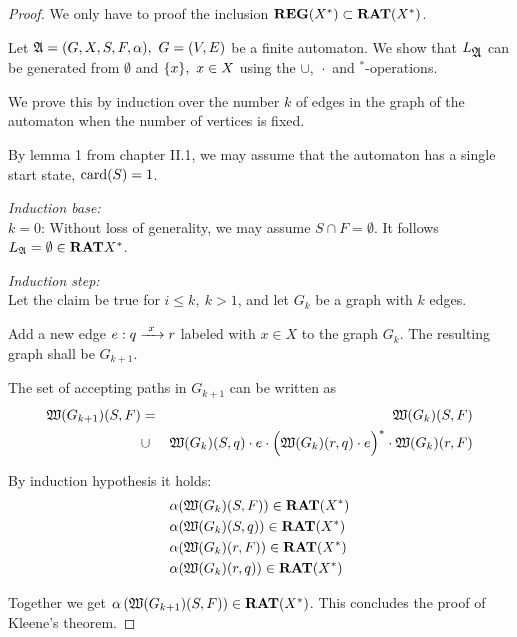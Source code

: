 \begin{proof}
We only have to proof the inclusion $\mbox{{\bf REG}}(X^*) \subset \mbox{{\bf RAT}}(X^*)$.

Let $\mbox{$\mathfrak{A}$} = (G, X, S, F, \alpha),\ G=(V, E)$ be a finite automaton. We show
that $L_{\mbox{$\mathfrak{A}$}}$ can be generated from $\emptyset$ and $\mbox{$\{x\}$},\ x \in X$ 
using the $\cup,\ \cdot$ and $^*$-operations.

We prove this by induction over the number $k$ of edges in the graph of the
automaton when the number of vertices is fixed.

By lemma 1 from chapter II.1, we may assume that the automaton has a single
start state, $\mathrm{card}({S}) = 1$.

{\em Induction base:}\\
$k = 0$: Without loss of generality, we may assume $S
\cap F = \emptyset$. It follows $\mbox{$L_{\mathfrak{A}}$} = \emptyset \in \mbox{{\bf RAT}}{X^*}$.

{\em Induction step:}\\
Let the claim be true for $i \leq k,\ k > 1$, and let $G_k$ be a graph with $k$
edges.

Add a new edge $e : q \xrightarrow{\ {x}\ } r$ labeled with $x \in X$ to the graph $G_k$. The
resulting graph shall be $G_{k+1}$. 

The set of accepting paths in $G_{k+1}$ can be written as
\begin{eqnarray*}
\mbox{$\mathfrak{W}({G_{k+1}})$}(S, F) & = & \mbox{$\mathfrak{W}({G_k})$}(S, F) \\
& \cup & \mbox{$\mathfrak{W}({G_k})$}(S, q) \cdot e \cdot \Big( \mbox{$\mathfrak{W}({G_k})$}(r, q) \cdot e 
\Big)^* \cdot \mbox{$\mathfrak{W}({G_k})$}(r, F)
\end{eqnarray*}

\begin{center}

\end{center}

By induction hypothesis it holds:
\begin{eqnarray*}
& \alpha(\mbox{$\mathfrak{W}({G_k})$}(S, F)) \in \mbox{{\bf RAT}}(X^*) \\
& \alpha(\mbox{$\mathfrak{W}({G_k})$}(S, q)) \in \mbox{{\bf RAT}}(X^*) \\
&\alpha(\mbox{$\mathfrak{W}({G_k})$}(r, F)) \in \mbox{{\bf RAT}}(X^*) \\
& \alpha(\mbox{$\mathfrak{W}({G_k})$}(r, q)) \in \mbox{{\bf RAT}}(X^*)
\end{eqnarray*}

Together we get $\alpha\left(\mbox{$\mathfrak{W}({G_{k+1}})$}(S, F)\right) \in \mbox{{\bf RAT}}(X^*)$.
This concludes the proof of Kleene's theorem.
\end{proof}

